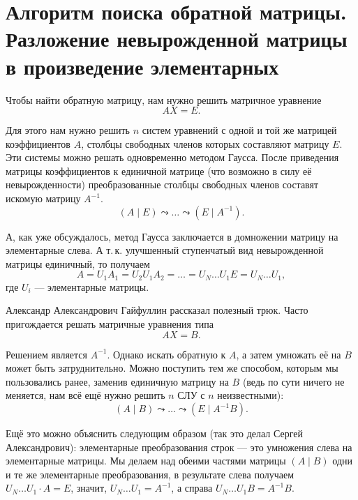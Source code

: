 \section{Алгоритм поиска обратной матрицы. Разложение невырожденной матрицы в произведение элементарных}

Чтобы найти обратную матрицу, нам нужно решить матричное уравнение
$$
AX = E.
$$

Для этого нам нужно решить $n$ систем уравнений с одной и той же матрицей коэффициентов $A$, столбцы свободных членов которых составляют матрицу $E$. Эти системы можно решать одновременно методом Гаусса. После приведения матрицы коэффициентов к единичной матрице (что возможно в силу её невырожденности) преобразованные столбцы свободных членов составят искомую матрицу $A^{-1}$.
$$
(A \mid E) \leadsto \ldots \leadsto (E \mid A^{-1}).
$$

А, как уже обсуждалось, метод Гаусса заключается в домножении матрицу на элементарные слева. А т.\,к. улучшенный ступенчатый вид невырожденной матрицы единичный, то получаем
$$
A = U_1A_1 = U_2U_1A_2 = \ldots = U_N\ldots U_1 E = U_N\ldots U_1,
$$
где $U_i$ --- элементарные матрицы.

Александр Александрович Гайфуллин рассказал полезный трюк. Часто пригождается решать матричные уравнения типа
$$
AX = B.
$$

Решением является $A^{-1}$. Однако искать обратную к $A$, а затем умножать её на $B$ может быть затруднительно. Можно поступить тем же способом, которым мы пользовались ранее, заменив единичную матрицу на $B$ (ведь по сути ничего не меняется, нам всё ещё нужно решить $n$ СЛУ с $n$ неизвестными):
$$
(A \mid B) \leadsto \ldots \leadsto (E \mid A^{-1}B).
$$

Ещё это можно объяснить следующим образом (так это делал Сергей Александрович): элементарные преобразования строк --- это умножения слева на элементарные матрицы. Мы делаем над обеими частями матрицы $(A\mid B)$ одни и те же элементарные преобразования, в результате слева получаем $U_N\ldots U_1 \cdot A = E$, значит, $U_N\ldots U_1 = A^{-1}$, а справа $U_N\ldots U_1 B = A^{-1}B$.

